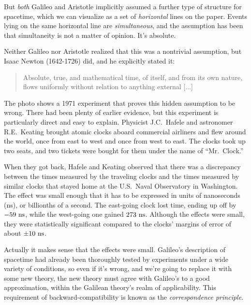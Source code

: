 But \emph{both} Galileo and Aristotle implicitly assumed a further type of structure
for spacetime, which we can visualize as a set of \emph{horizontal} lines on the paper.
Events lying on the same horizontal line are \emph{simultaneous}, and the assumption has been that
simultaneity is not a matter of opinion. It's absolute.

\pagebreak

Neither Galileo nor Aristotle realized
that this was a nontrivial assumption, but Isaac Newton (1642-1726) did, and he explicitly stated it:
%
\begin{quote}
Absolute, true, and mathematical time, of itself, and from its own nature,
flows uniformly without relation to anything external [...]
\end{quote}




The photo
shows a 1971 experiment that proves this hidden assumption to be wrong.
There had been plenty of earlier evidence, but this experiment is particularly direct and easy to explain.
Physicist J.C.~Hafele and astronomer R.E.~Keating  brought atomic clocks aboard commercial
airliners and flew around the world, once from east to west and once from west to east.
The clocks took up two seats, and two tickets were bought for them under the name of ``Mr.~Clock.''

When they got back, Hafele and Keating observed that there was a discrepancy between the times measured by the
traveling clocks and the times measured by similar clocks that stayed home at the U.S.~Naval Observatory in Washington.
The effect was small enough that it has to be expressed in units of nanoseconds (ns), or billionths of a second.
The east-going clock lost time, ending up off by $-59\ \textup{ns}$, while the west-going 
one gained $273\ \textup{ns}$. Although the effects were small, they were statistically significant compared
to the clocks' margins of error of about $\pm 10\ \zu{ns}$. 

Actually it makes sense that the effects were small.
Galileo's description of spacetime  had already been thoroughly tested by experiments under a wide variety of conditions,
so even if it's wrong, and we're going to replace it with some new theory, the
new theory must agree with Galileo's to a good approximation, within the Galilean theory's
realm of applicability. This requirement of backward-compatibility is known as
the \emph{correspondence principle}.

